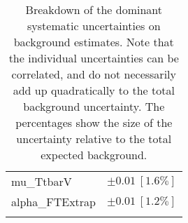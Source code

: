 \begin{table}
\begin{center}
\begin{tabular*}{\textwidth}{@{\extracolsep{\fill}}lc}
mu\_TtbarV         & $\pm 0.01\ [1.6\%] $       \\
alpha\_FTExtrap         & $\pm 0.01\ [1.2\%] $       \\
\noalign{\smallskip}\hline\noalign{\smallskip}
\end{tabular*}
\end{center}
\caption[Breakdown of uncertainty on background estimates]{
Breakdown of the dominant systematic uncertainties on background estimates.
Note that the individual uncertainties can be correlated, and do not necessarily add up quadratically to 
the total background uncertainty. The percentages show the size of the uncertainty relative to the total expected background.
\label{table.results.bkgestimate.uncertainties.SRC5}}
\end{table}
%